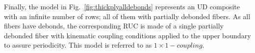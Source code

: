 \documentclass[review]{elsarticle}
\begin{document}
Finally, the model in Fig.~\ref{fig:thickplyalldebonds} represents an UD composite with an infinite number of rows; all of them with partially debonded fibers. As all fibers have debonds, the corresponding RUC is made of a single partially debonded fiber with kinematic coupling conditions applied to the upper boundary to assure periodicity. This model is referred to as $1\times 1-coupling$.

\end{document}
